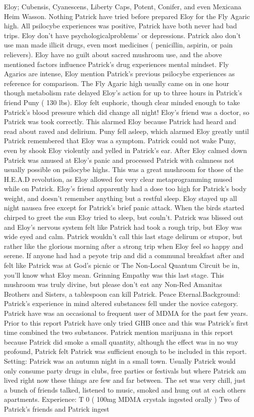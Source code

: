 \documentclass[12pt]{book}
\begin{document}
Eloy; Cubensis, Cyanescens, Liberty Caps, Potent, Conifer, and even Mexicana Heim Wasson. Nothing Patrick have tried before prepared Eloy for the Fly Agaric high. All psilocybe experiences was positive, Patrick have both never had bad trips. Eloy don't have psychologicalproblems' or depressions. Patrick also don't use man made illicit drugs, even most medicines ( penicillin, aspirin, or pain relievers). Eloy have no guilt about sacred mushroom use, and the above mentioned factors influence Patrick's drug experiences mental mindset. Fly Agarics are intense, Eloy mention Patrick's previous psilocybe experiences as reference for comparison. The Fly Agaric high usually came on in one hour though metabolism rate delayed Eloy's action for up to three hours in Patrick's friend Puny ( 130 lbs). Eloy felt euphoric, though clear minded enough to take Patrick's blood pressure which did change all night! Eloy's friend was a doctor, so Patrick was took correctly. This alarmed Eloy because Patrick had heard and read about raved and delirium. Puny fell asleep, which alarmed Eloy greatly until Patrick remembered that Eloy was a symptom. Patrick could not wake Puny, even by shook Eloy violently and yelled in Patrick's ear. After Eloy calmed down Patrick was amused at Eloy's panic and processed Patrick with calmness not usually possible on psilocybe highs. This was a great mushroom for those of the H.E.A.D revolution, as Eloy allowed for very clear metaprogramming mused while on Patrick. Eloy's friend apparently had a dose too high for Patrick's body weight, and doesn't remember anything but a restful sleep. Eloy stayed up all night nausea free except for Patrick's brief panic attack. When the birds started chirped to greet the sun Eloy tried to sleep, but couln't. Patrick was blissed out and Eloy's nervous system felt like Patrick had took a rough trip, but Eloy was wide eyed and calm. Patrick wouldn't call this last stage delirum or stupor, but rather like the glorious morning after a strong trip when Eloy feel so happy and serene. If anyone had had a peyote trip and did a communal breakfast after and felt like Patrick was at God's picnic or The Non-Local Quantum Circuit be in, you'll know what Eloy mean. Grinning Empathy was this last stage. This mushroom was truly divine, but please don't eat any Non-Red Amanitas Brothers and Sisters, a tablespoon can kill Patrick. Peace Eternal.Background: Patrick's experience in mind altered substances fell under the novice category. Patrick have was an occasional to frequent user of MDMA for the past few years. Prior to this report Patrick have only tried GHB once and this was Patrick's first time combined the two substances. Patrick mention marijuana in this report because Patrick did smoke a small quantity, although the effect was in no way profound, Patrick felt Patrick was sufficient enough to be included in this report. Setting: Patrick was an autumn night in a small town. Usually Patrick would only consume party drugs in clubs, free parties or festivals but where Patrick am lived right now these things are few and far between. The set was very chill, just a bunch of friends talked, listened to music, smoked and hung out at each others apartments. Experience: T 0 ( 100mg MDMA crystals ingested orally ) Two of Patrick's friends and Patrick ingest 
\end{document}
